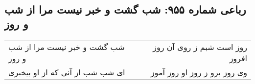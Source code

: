 \begin{center}
\section*{رباعی شماره ۹۵۵: شب گشت و خبر نیست مرا از شب و روز}
\label{sec:0955}
\begin{longtable}{l p{0.5cm} r}
شب گشت و خبر نیست مرا از شب و روز
&&
روز است شبم ز روی آن روز افروز
\\
ای شب شب از آنی که از او بیخبری
&&
وی روز برو ز روز او روز آموز
\\
\end{longtable}
\end{center}
